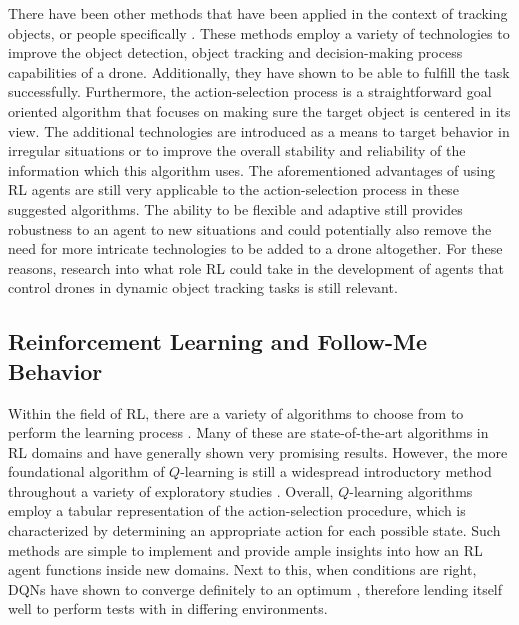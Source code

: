 There have been other methods that have been applied in the context of tracking 
objects, or people specifically \cite{DroneFollowUsingPhone, acousticdronefollower, DroneFollowMobileObject, VisualGPS}. 
These methods employ a variety of technologies to improve the object detection, 
object tracking and decision-making process capabilities of a drone. Additionally, 
they have shown 
to be able to fulfill the task successfully. Furthermore, the action-selection 
process is a straightforward goal oriented algorithm that focuses on making sure the 
target object is centered in its view. The additional technologies are introduced as a means to 
target behavior in irregular situations or to improve the overall stability and reliability 
of the information which this algorithm uses. The aforementioned advantages of using RL 
agents are still very applicable to the action-selection process in these suggested 
algorithms. The ability to be 
flexible and adaptive still provides robustness to an agent to new situations and could 
potentially also remove the need for more intricate technologies to be added to a 
drone altogether. For these reasons, research into what role RL could take in 
the development of agents that control drones in dynamic object tracking tasks 
is still relevant. 

\subsection{Reinforcement Learning and Follow-Me Behavior}
Within the field of RL, there are a variety of algorithms to choose from to perform 
the learning process \cite{A3C, DDPG, PPO, SAC, DQNDeepmind, policygradients}. Many of these are 
state-of-the-art algorithms in RL domains and have generally shown 
very promising results. However, the more foundational algorithm of $Q$-learning is still 
a widespread introductory method throughout a variety of exploratory studies \cite{DQNasBenchmark}. 
Overall, $Q$-learning algorithms employ a tabular representation of the action-selection procedure, 
which is characterized by determining an appropriate action for each possible state. Such 
methods are simple to implement and provide ample insights into how an RL agent functions 
inside new domains. Next to this, when conditions are right, DQNs have shown to converge 
definitely to an optimum \cite{DQNprovedConvergence}, therefore lending itself well 
to perform tests with in differing environments. 

